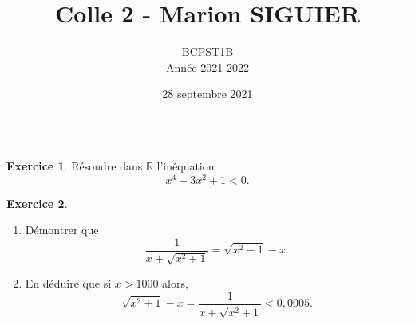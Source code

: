 \documentclass[a4paper, 11pt,openany]{article}%
\title{Colle 2 - Marion SIGUIER}
\author{BCPST1B\\
Année 2021-2022}
\date{28 septembre 2021}
\theoremstyle{plain}
\theoremstyle{definition}
\newtheorem{exo}{Exercice}
\newtheorem{sol}{Solution de l'exercice}
\theoremstyle{remark}
\newcommand{\R}{\mathbb{R}}
\begin{document}
   \maketitle
      \rule{\linewidth}{0.5mm}

\begin{exo}
Résoudre dans $\R$ l'inéquation
\[ x^4 - 3x^2 +1 < 0.\]
\end{exo}


\begin{exo}
\begin{enumerate}
\item Démontrer que
\[ \frac{1}{x + \sqrt{x^2 +1 }} = \sqrt{x^2 +1} - x .\]
\item En déduire que si $x > 1000$ alors,
\[ \sqrt{x^2+1}-x = \frac{1}{x + \sqrt{x^2 +1 }} <  0,0005.\] 
\end{enumerate}
\end{exo}

\end{document}
